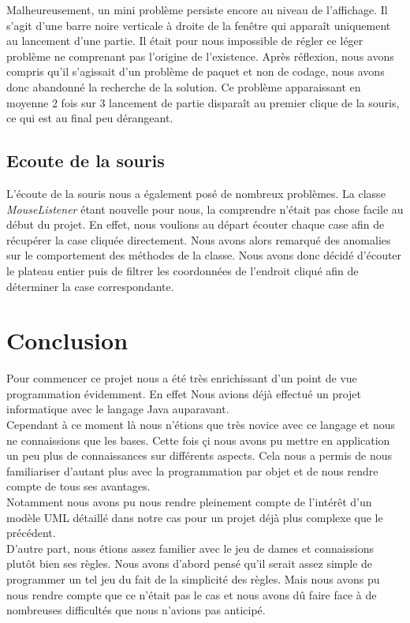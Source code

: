 \documentclass[12,french]{report}
\begin{document}
Malheureusement, un mini problème persiste encore au niveau de l'affichage. Il s'agit d'une barre noire verticale à droite de la fenêtre qui apparaît uniquement au lancement d'une partie. Il était pour nous impossible de régler ce léger problème ne comprenant pas l'origine de l'existence. Après réflexion, nous avons compris qu'il s'agissait d'un problème de paquet et non de codage, nous avons donc abandonné la recherche de la solution. Ce problème apparaissant en moyenne 2 fois sur 3 lancement de partie disparaît au premier clique de la souris, ce qui est au final peu dérangeant.
 
\section{Ecoute de la souris}

L'écoute de la souris nous a également posé de nombreux problèmes. La classe \textit{MouseListener} étant nouvelle pour nous, la comprendre n'était pas chose facile au début du projet. En effet, nous voulions au départ écouter chaque case afin de récupérer la case cliquée directement. Nous avons alors remarqué des anomalies sur le comportement des méthodes de la classe. Nous avons donc décidé d'écouter le plateau entier puis de filtrer les coordonnées de l'endroit cliqué afin de déterminer la case correspondante.


\chapter*{Conclusion}

Pour commencer ce projet nous a été très enrichissant d'un point de vue programmation évidemment. En effet Nous avions déjà effectué un projet informatique avec le langage Java auparavant. \\
Cependant à ce moment là nous n'étions que très novice avec ce langage et nous ne connaissions que les bases. Cette fois çi nous avons pu mettre en application un peu plus de connaissances sur différents aspects. Cela nous a permis de nous familiariser d'autant plus avec la programmation par objet et de nous rendre compte de tous ses avantages.\\
Notamment nous avons pu nous rendre pleinement compte de l'intérêt d'un modèle UML détaillé dans notre cas pour un projet déjà plus complexe que le précédent.\\

D'autre part, nous étions assez familier avec le jeu de dames et connaissions plutôt bien ses règles. Nous avons d'abord pensé qu'il serait assez simple de programmer un tel jeu du fait de la simplicité des règles. Mais nous avons pu nous rendre compte que ce n'était pas le cas et nous avons dû faire face à de nombreuses difficultés que nous n'avions pas anticipé.\\
\end{document}
